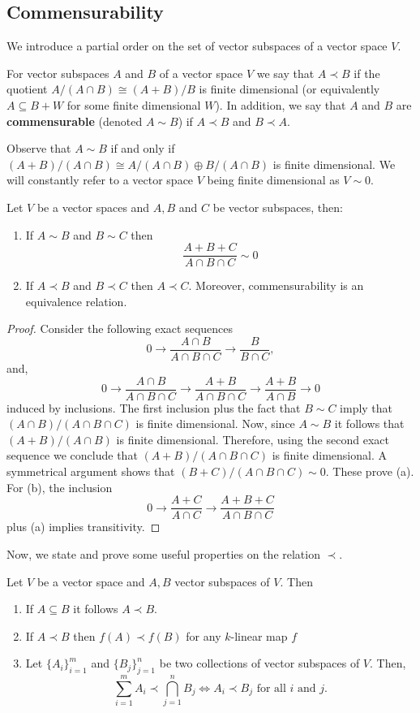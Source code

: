 \subsection*{Commensurability}
We introduce a partial order on the set of vector subspaces of a vector space $V$.
\begin{definition}\label{def:commensurability}
	For vector subspaces $A$ and $B$ of a vector space $V$ we say that $A \prec B$ if the quotient $A/(A\cap B) \cong (A+B)/B$ is finite dimensional (or equivalently $A \subseteq B + W$ for some finite dimensional $W$). In addition, we say that $A$ and $B$ are \textbf{commensurable} (denoted $A \sim B$) if $A \prec B$ and $B \prec A$.
\end{definition}
Observe that $A \sim B$ if and only if $(A+B)/(A\cap B) \cong A/(A\cap B) \oplus B/(A \cap B)$ is finite dimensional. We will constantly refer to a vector space $V$ being finite dimensional as $V \sim 0$.
\begin{proposition}\label{prop:equivalence-relation}
	Let $V$ be a vector spaces and $A,B$ and $C$ be vector subspaces, then:
	\begin{enumerate}[label = (\alph*)]
		\item If $A \sim B$ and $B \sim C$ then
		\[
			\frac{A+B+C}{A \cap B \cap C} \sim 0
		\]
		\item If $A \prec B$ and $B \prec C$ then $A \prec C$. Moreover, commensurability is an equivalence relation.
	\end{enumerate}
\end{proposition}
\begin{proof}
	Consider the following exact sequences
	\[
		0 \to \frac{A\cap B}{A \cap B \cap C} \to \frac{B}{B \cap C}, 
	\]
	and,
	\[
		0 \to \frac{A\cap B}{A \cap B \cap C} \to \frac{A+B}{A \cap B \cap C}
		\to \frac{A+B}{A \cap B} \to 0
	\]
	induced by inclusions. The first inclusion plus the fact that $B \sim C$ imply that $(A\cap B)/(A \cap B \cap C)$ is finite dimensional. Now, since $A \sim B$ it follows that $(A+B)/(A \cap B)$ is finite dimensional. Therefore, using the second exact sequence we conclude that $(A+B)/(A \cap B \cap C)$ is finite dimensional. A symmetrical argument shows that $(B+C)/(A \cap B \cap C) \sim 0$. These prove (a). For (b), the inclusion
	\[
		0 \to \frac{A+C}{A\cap C} \to \frac{A+B+C}{A \cap B \cap C}
	\]
	plus (a) implies transitivity. 
\end{proof}
Now, we state and prove some useful properties on the relation $\prec$.
\begin{lemma}\label{lemm:properties-order-well-behaved-under-operations}
Let $V$ be a vector space and $A,B$ vector subspaces of $V$. Then
\begin{enumerate}[label = (\alph*)]
	\item If $A \subseteq B$ it follows $A \prec B$.
	\item If $A \prec B$ then $f(A) \prec f(B)$ for any $k$-linear map $f$
	\item Let $\{A_{i}\}_{i=1}^{m}$ and $\{B_{j}\}_{j=1}^{n}$ be two collections of vector subspaces of $V$. Then,
	\[
		\sum_{i=1}^{m} A_{i} \prec \bigcap_{j=1}^{n} B_{j} \iff A_{i} \prec B_{j}\text{  for all } i \text{ and } j.
	\]
\end{enumerate}
\end{lemma}
